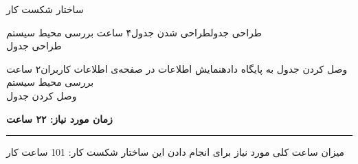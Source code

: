 \begin{wbsbox}{ساختار شکست کار}
\begin{wbssub}{طراحی جدول}{طراحی شدن جدول}{۴ ساعت}
\task بررسی محیط سیستم  \\
\task طراحی جدول
\end{wbssub}

\begin{wbssub}{وصل کردن جدول به پایگاه داده}{نمایش اطلاعات در صفحه‌ی اطلاعات کاربران}{۲ ساعت}
\task بررسی محیط سیستم  \\
\task وصل کردن جدول
\end{wbssub}
\begin{center}
\textbf{زمان مورد نیاز: ۲۲ ساعت}
\vspace{2mm}
\hrule height 0.6pt
\vspace{2mm}
میزان ساعت کلی مورد نیاز برای انجام دادن این ساختار شکست کار: 101 ساعت کار
\end{center}
\end{wbsbox}
